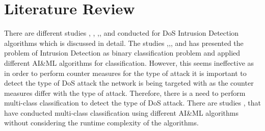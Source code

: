 \documentclass[conference]{IEEEtran}
\begin{document}

\section{Literature Review}
There are different studies \cite{verma2020machine}, \cite{NSL_kdd}, \cite{kim2020cnn},\cite{nagar2020novel}, \cite{su2020bat} and \cite{almseidin2019applying} conducted for DoS Intrusion Detection algorithms which is discussed in detail. The studies \cite{almseidin2019applying},\cite{verma2020machine},\cite{NSL_kdd},\cite{kim2020cnn} and \cite{su2020bat} has presented the problem of Intrusion Detection as binary classification problem and applied different AI\&ML algorithms for classification. However, this seems ineffective as in order to perform counter measures for the type of attack it is important to detect the type of DoS attack the network is being targeted with as the counter measures differ with the type of attack. Therefore, there is a need to perform multi-class classification to detect the type of DoS attack. There are studies \cite{kim2020cnn},\cite{su2020bat} that have conducted multi-class classification using different AI\&ML algorithms without considering the runtime complexity of the algorithms.    

\end{document}

